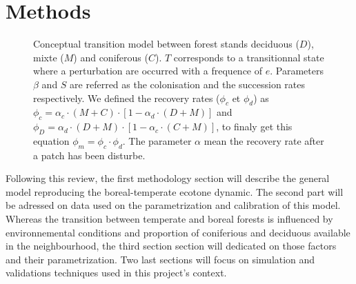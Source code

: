 
\section{Methods}   

\begin{figure}         
	
	\caption{Conceptual transition model between forest stands deciduous ($D$),
	mixte ($M$) and coniferous ($C$). $T$ corresponds to a transitionnal state
	where a perturbation are occurred with a frequence of $e$. Parameters $\beta$
	and $S$ are referred as the colonisation and the succession rates
	respectively. We defined the recovery rates ($\phi_c$ et $\phi_d$) as $\phi_c
	= \alpha_c \cdot (M+C) \cdot [1- \alpha_d \cdot (D +M)]$ and $\phi_D =
	\alpha_d \cdot (D+M) \cdot [1- \alpha_c \cdot (C +M)]$, to finaly get this
	equation $\phi_m = \phi_c \cdot \phi_d$. The parameter $\alpha$ mean the
	recovery rate after a patch has been disturbe.}         
	\label{Model}
\end{figure}


Following this review, the first methodology section will describe the general
model reproducing the boreal-temperate ecotone dynamic. The second part will
be adressed on data used on the parametrization and calibration of this model.
Whereas the transition between temperate and boreal forests is influenced by
environnemental conditions and proportion of coniferious and deciduous
available in the neighbourhood, the third section section will dedicated on
those factors and their parametrization. Two last sections will focus on
simulation and validations techniques used in this project's context.\\

